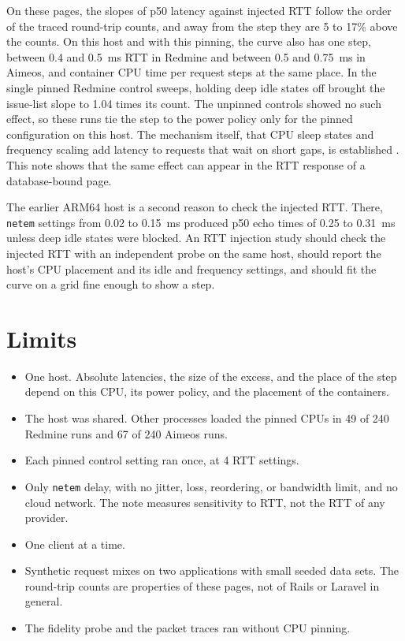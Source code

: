 \documentclass[11pt]{article}
\begin{document}
On these pages, the slopes of p50 latency against injected RTT follow the order of the traced
round-trip counts, and away from the step they are 5 to 17\% above the counts. On this host and with this pinning, the curve also has one step, between
0.4 and 0.5~ms RTT in Redmine and between 0.5 and 0.75~ms in Aimeos, and container CPU time
per request steps at the same place. In the single pinned Redmine control sweeps, holding deep
idle states off brought the issue-list slope to 1.04 times its count. The unpinned controls
showed no such effect, so these runs tie the step to the power policy only for the pinned
configuration on this host. The mechanism itself, that CPU sleep states and frequency scaling
add latency to requests that wait on short gaps, is established
\citep{kanev2014tradeoffs,li2014tales,chou2019udpm,hajyahya2022agilewatts}. This note shows
that the same effect can appear in the RTT response of a database-bound page.

The earlier ARM64 host is a second reason to check the injected RTT. There, \texttt{netem}
settings from 0.02 to 0.15~ms produced p50 echo times of 0.25 to 0.31~ms unless deep idle
states were blocked. An RTT injection study should check the injected RTT with an independent
probe on the same host, should report the host's CPU placement and its idle and frequency
settings, and should fit the curve on a grid fine enough to show a step.

\section{Limits}
\label{sec:limits}

\begin{itemize}
  \item One host. Absolute latencies, the size of the excess, and the place of the step depend
    on this CPU, its power policy, and the placement of the containers.
  \item The host was shared. Other processes loaded the pinned CPUs in 49 of 240 Redmine runs
    and 67 of 240 Aimeos runs.
  \item Each pinned control setting ran once, at 4 RTT settings.
  \item Only \texttt{netem} delay, with no jitter, loss, reordering, or bandwidth limit, and no
    cloud network. The note measures sensitivity to RTT, not the RTT of any provider.
  \item One client at a time.
  \item Synthetic request mixes on two applications with small seeded data sets. The round-trip
    counts are properties of these pages, not of Rails or Laravel in general.
  \item The fidelity probe and the packet traces ran without CPU pinning.
\end{itemize}
\end{document}
